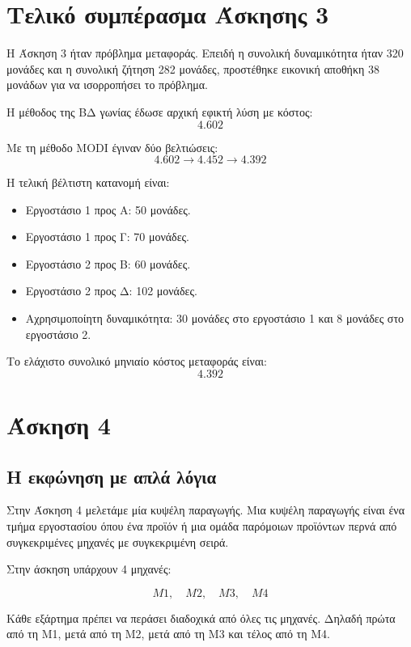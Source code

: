 \documentclass[12pt,a4paper]{article}
\begin{document}
\section{Τελικό συμπέρασμα Άσκησης 3}

Η Άσκηση 3 ήταν πρόβλημα μεταφοράς. Επειδή η συνολική δυναμικότητα ήταν 320 μονάδες και η συνολική ζήτηση 282 μονάδες, προστέθηκε εικονική αποθήκη 38 μονάδων για να ισορροπήσει το πρόβλημα.

Η μέθοδος της ΒΔ γωνίας έδωσε αρχική εφικτή λύση με κόστος:
\[
4.602
\]

Με τη μέθοδο MODI έγιναν δύο βελτιώσεις:
\[
4.602 \rightarrow 4.452 \rightarrow 4.392
\]

Η τελική βέλτιστη κατανομή είναι:

\begin{itemize}
    \item Εργοστάσιο 1 προς Α: 50 μονάδες.
    \item Εργοστάσιο 1 προς Γ: 70 μονάδες.
    \item Εργοστάσιο 2 προς Β: 60 μονάδες.
    \item Εργοστάσιο 2 προς Δ: 102 μονάδες.
    \item Αχρησιμοποίητη δυναμικότητα: 30 μονάδες στο εργοστάσιο 1 και 8 μονάδες στο εργοστάσιο 2.
\end{itemize}

Το ελάχιστο συνολικό μηνιαίο κόστος μεταφοράς είναι:
\[
\boxed{4.392}
\]

\newpage

\section{Άσκηση 4}

\subsection{Η εκφώνηση με απλά λόγια}

Στην Άσκηση 4 μελετάμε μία κυψέλη παραγωγής. Μια κυψέλη παραγωγής είναι ένα τμήμα εργοστασίου όπου ένα προϊόν ή μια ομάδα παρόμοιων προϊόντων περνά από συγκεκριμένες μηχανές με συγκεκριμένη σειρά.

Στην άσκηση υπάρχουν 4 μηχανές:

\[
M1,\quad M2,\quad M3,\quad M4
\]

Κάθε εξάρτημα πρέπει να περάσει διαδοχικά από όλες τις μηχανές. Δηλαδή πρώτα από τη Μ1, μετά από τη Μ2, μετά από τη Μ3 και τέλος από τη Μ4.
\end{document}
